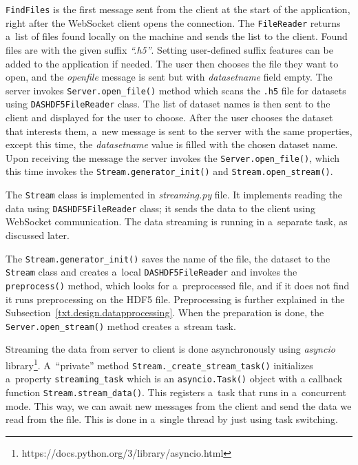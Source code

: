 \texttt{FindFiles} is the first message sent from the client at the start of the application, right after the WebSocket client opens the connection. The \texttt{FileReader} returns a~list of files found locally on the machine and sends the list to the client. Found files are with the given suffix \textit{``.h5''}. Setting user-defined suffix features can be added to the application if needed. The user then chooses the file they want to open, and the \textit{openfile} message is sent but with \textit{datasetname} field empty. The server invokes \texttt{Server.open\_file()} method which scans the \texttt{.h5} file for datasets using \texttt{DASHDF5FileReader} class. The list of dataset names is then sent to the client and displayed for the user to choose. After the user chooses the dataset that interests them, a~new message is sent to the server with the same properties, except this time, the \textit{datasetname} value is filled with the chosen dataset name. Upon receiving the message the server invokes the \texttt{Server.open\_file()}, which this time invokes the \texttt{Stream.generator\_init()} and \texttt{Stream.open\_stream()}. 

The \texttt{Stream} class is implemented in \textit{streaming.py} file. It implements reading the data using \texttt{DASHDF5FileReader} class; it sends the data to the client using WebSocket communication. The data streaming is running in a~separate task, as discussed later.

The \texttt{Stream.generator\_init()} saves the name of the file, the dataset to the \texttt{Stream} class and creates a~local \texttt{DASHDF5FileReader} and invokes the \texttt{preprocess()} method, which looks for a~preprocessed file, and if it does not find it runs preprocessing on the HDF5 file. Preprocessing is further explained in the Subsection~\ref{txt.design.datapprocessing}. When the preparation is done, the \texttt{Server.open\_stream()} method creates a~stream task.

Streaming the data from server to client is done asynchronously using \textit{asyncio} library\footnote{https://docs.python.org/3/library/asyncio.html}. A~``private'' method \texttt{Stream.\_create\_stream\_task()} initializes a~property \texttt{streaming\_task} which is an \texttt{asyncio.Task()} object with a callback function \texttt{Stream.stream\_data()}. This registers a~task that runs in a~concurrent mode. This way, we can await new messages from the client and send the data we read from the file. This is done in a~single thread by just using task switching. 

